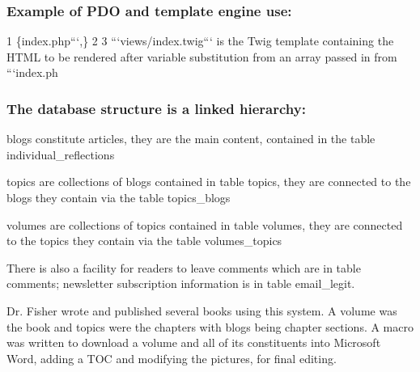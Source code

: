 \subsubsection*{Example of P\+DO and template engine use\+:}


\begin{DoxyCode}
1 \{index.php```,\}
2 
3 ```views/index.twig``` is the Twig template containing the HTML to be rendered after variable substitution
       from an array passed in from ```index.ph
\end{DoxyCode}
 



\subsubsection*{The database structure is a linked hierarchy\+:}


\begin{DoxyItemize}
\item {\ttfamily blog}s constitute articles, they are the main content, contained in the table {\ttfamily individual\+\_\+reflections}
\item {\ttfamily topic}s are collections of {\ttfamily blog}s contained in table {\ttfamily topics}, they are connected to the {\ttfamily blog}s they contain via the table {\ttfamily topics\+\_\+blogs}
\item {\ttfamily volume}s are collections of {\ttfamily topic}s contained in table {\ttfamily volumes}, they are connected to the {\ttfamily topic}s they contain via the table {\ttfamily volumes\+\_\+topics}
\end{DoxyItemize}

There is also a facility for readers to leave comments which are in table {\ttfamily comments}; newsletter subscription information is in table {\ttfamily email\+\_\+legit}. 



Dr. Fisher wrote and published several books using this system. A {\ttfamily volume} was the book and {\ttfamily topic}s were the chapters with {\ttfamily blog}s being chapter sections. A macro was written to download a {\ttfamily volume} and all of its constituents into Microsoft Word, adding a T\+OC and modifying the pictures, for final editing. 